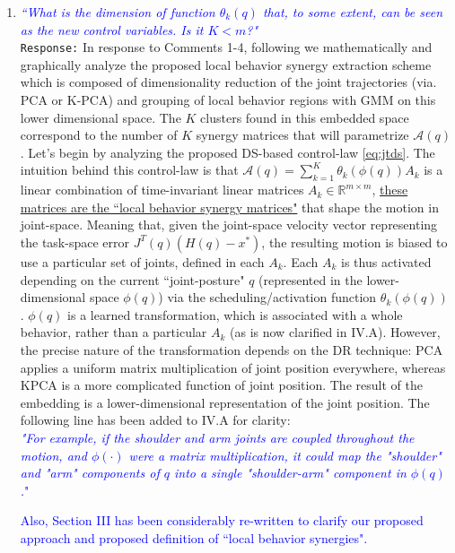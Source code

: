 \documentclass{article}
\begin{document}
\begin{enumerate}
\item \textcolor{blue}{\textit{``What is the dimension of function $\theta_k(q)$ that, to some extent, can be seen as the new control variables. Is it $K<m$?"}}\\

\texttt{Response:} In response to Comments 1-4, following we mathematically and graphically analyze the proposed local behavior synergy extraction scheme which is composed of dimensionality reduction of the joint trajectories (via. PCA or K-PCA) and grouping of local behavior regions with GMM on this lower dimensional space. The $K$ clusters found in this embedded space correspond to the number of $K$ synergy matrices that will parametrize $\mathcal{A}(q)$. Let's begin by analyzing the proposed DS-based control-law \eqref{eq:jtds}. The intuition behind this control-law is that $\mathcal{A}(q) = \sum\limits_{k=1}^{K}\theta_k(\phi(q))A_k$ is a linear combination of time-invariant linear matrices $A_k \in \mathbb{R}^{m \times m}$, \underline{these matrices are the ``local behavior synergy matrices"} that shape the motion in joint-space. Meaning that, given the joint-space velocity vector representing the task-space error $J^{T}(q)(H(q)-x^*)$, the resulting motion is biased to use a particular set of joints, defined in each $A_k$. Each $A_k$ is thus activated depending on the current ``joint-posture" $q$ (represented in the lower-dimensional space $\phi(q)$) via the scheduling/activation function $\theta_k(\phi(q))$.
$\phi(q)$ is a learned transformation, which is associated with a whole behavior, rather than a particular $A_k$ (as is now clarified in IV.A). However, the precise nature of the transformation depends on the DR technique: PCA applies a uniform matrix multiplication of joint position everywhere, whereas KPCA is a more complicated function of joint position.  The result of the embedding is a lower-dimensional representation of the joint position. The following line has been added to IV.A for clarity:\\
\textcolor{blue}{\small \textit{"For example, if the shoulder and arm joints are coupled throughout the motion, and $\phi(\cdot)$ were a matrix multiplication, it could map the "shoulder" and "arm" components of $q$ into a single "shoulder-arm" component in $\phi(q)$.}"}

\textcolor{blue}{\small Also, Section III has been considerably re-written to clarify our proposed approach and proposed definition of ``local behavior synergies".}


\end{enumerate}
\end{document}
